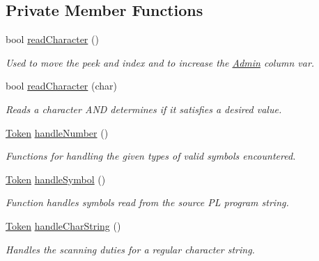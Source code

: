 \subsection*{Private Member Functions}
\begin{DoxyCompactItemize}
\item 
bool \hyperlink{classScanner_a061b8284e974b60bece52e2758626c5c}{readCharacter} ()
\begin{DoxyCompactList}\small\item\em Used to move the peek and index and to increase the \hyperlink{classAdmin}{Admin} column var. \item\end{DoxyCompactList}\item 
bool \hyperlink{classScanner_a7a3f12786edc746328451403aaa94288}{readCharacter} (char)
\begin{DoxyCompactList}\small\item\em Reads a character AND determines if it satisfies a desired value. \item\end{DoxyCompactList}\item 
\hyperlink{classToken}{Token} \hyperlink{classScanner_a7e893ad25781c012e020998b327828bd}{handleNumber} ()
\begin{DoxyCompactList}\small\item\em Functions for handling the given types of valid symbols encountered. \item\end{DoxyCompactList}\item 
\hyperlink{classToken}{Token} \hyperlink{classScanner_a245e35355ef6e5e9206faa99f3ddc9d5}{handleSymbol} ()
\begin{DoxyCompactList}\small\item\em Function handles symbols read from the source PL program string. \item\end{DoxyCompactList}\item 
\hyperlink{classToken}{Token} \hyperlink{classScanner_a5c9ba68f3ad81f1c95d42e0edcada347}{handleCharString} ()
\begin{DoxyCompactList}\small\item\em Handles the scanning duties for a regular character string. \item\end{DoxyCompactList}\end{DoxyCompactItemize}

